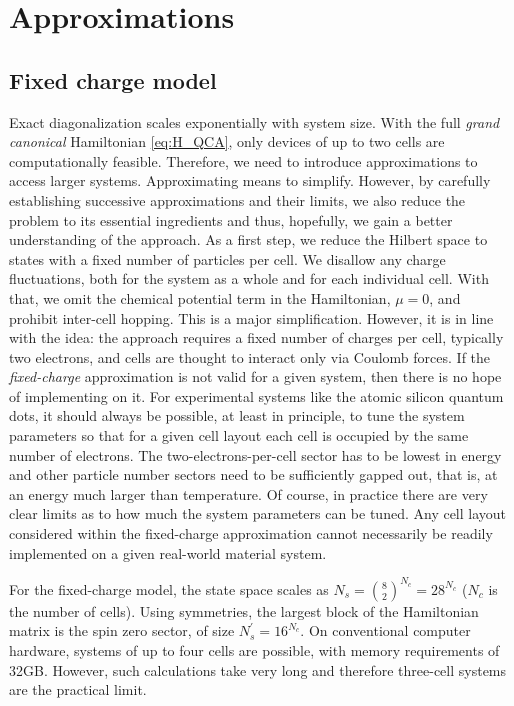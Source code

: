\chapter{Approximations}
\label{ch:approximations}
\graphicspath{{../gfx/chapter02/}{../plots/chapter02/}}

\section{Fixed charge model}

Exact diagonalization scales exponentially with system size. With the full
\emph{grand canonical}  Hamiltonian \eqref{eq:H_QCA}, only devices of
up to two cells are computationally feasible. Therefore, we need to introduce
approximations to access larger systems. Approximating means to simplify.
However, by carefully establishing successive approximations and their limits,
we also reduce the problem to its essential ingredients and thus, hopefully, we
gain a better understanding of the  approach. As a first step, we
reduce the Hilbert space to states with a fixed number of particles per cell. We
disallow any charge fluctuations, both for the system as a whole and for each
individual cell. With that, we omit the chemical potential term in the
Hamiltonian, $\mu = 0$, and prohibit inter-cell hopping. This is a major
simplification. However, it is in line with the  idea: the approach
requires a fixed number of charges per cell, typically two electrons, and cells
are thought to interact only via Coulomb forces. If the \emph{fixed-charge}
approximation is not valid for a given system, then there is no hope of
implementing  on it. For experimental systems like the atomic silicon
quantum dots, it should always be possible, at least in principle, to tune the
system parameters so that for a given cell layout each cell is occupied by the
same number of electrons. The two-electrons-per-cell sector has to be lowest in
energy and other particle number sectors need to be sufficiently gapped out,
that is, at an energy much larger than temperature. Of course, in practice there
are very clear limits as to how much the system parameters can be tuned. Any
 cell layout considered within the fixed-charge approximation cannot
necessarily be readily implemented on a given real-world material system.

For the fixed-charge model, the state space scales as $N_s = \binom{8}{2}^{N_c}
= 28^{N_c}$ ($N_c$ is the number of cells). Using symmetries, the largest block
of the Hamiltonian matrix is the spin zero sector, of size $N_s^{\prime} =
16^{N_c}$. On conventional computer hardware, systems of up to four cells are
possible, with memory requirements of 32GB. However, such calculations take very
long and therefore three-cell systems are the practical limit.


